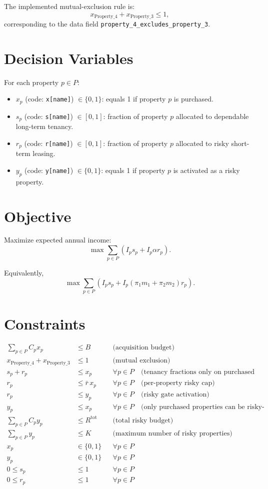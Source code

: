 The implemented mutual-exclusion rule is:
\[
x_{\text{Property\_4}} + x_{\text{Property\_3}} \le 1,
\]
corresponding to the data field \texttt{property\_4\_excludes\_property\_3}.

\section*{Decision Variables}

For each property $p \in P$:
\begin{itemize}
    \item $x_p$ (code: \texttt{x[name]}) $\in \{0,1\}$: equals 1 if property $p$ is purchased.
    \item $s_p$ (code: \texttt{s[name]}) $\in [0,1]$: fraction of property $p$ allocated to dependable long-term tenancy.
    \item $r_p$ (code: \texttt{r[name]}) $\in [0,1]$: fraction of property $p$ allocated to risky short-term leasing.
    \item $y_p$ (code: \texttt{y[name]}) $\in \{0,1\}$: equals 1 if property $p$ is activated as a risky property.
\end{itemize}

\section*{Objective}

Maximize expected annual income:
\[
\max \sum_{p \in P} \left( I_p s_p + I_p \alpha r_p \right).
\]

Equivalently,
\[
\max \sum_{p \in P} \left( I_p s_p + I_p(\pi_1 m_1 + \pi_2 m_2) r_p \right).
\]

\section*{Constraints}

\begin{align}
\sum_{p \in P} C_p x_p &\le B
&& \text{(acquisition budget)} \\
x_{\text{Property\_4}} + x_{\text{Property\_3}} &\le 1
&& \text{(mutual exclusion)} \\
s_p + r_p &\le x_p
&& \forall p \in P \quad \text{(tenancy fractions only on purchased properties)} \\
r_p &\le \bar r\, x_p
&& \forall p \in P \quad \text{(per-property risky cap)} \\
r_p &\le y_p
&& \forall p \in P \quad \text{(risky gate activation)} \\
y_p &\le x_p
&& \forall p \in P \quad \text{(only purchased properties can be risky-enabled)} \\
\sum_{p \in P} C_p y_p &\le R^{\text{tot}}
&& \text{(total risky budget)} \\
\sum_{p \in P} y_p &\le K
&& \text{(maximum number of risky properties)} \\
x_p &\in \{0,1\}
&& \forall p \in P \\
y_p &\in \{0,1\}
&& \forall p \in P \\
0 \le s_p &\le 1
&& \forall p \in P \\
0 \le r_p &\le 1
&& \forall p \in P
\end{align}

